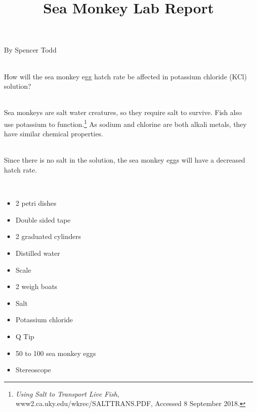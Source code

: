 \documentclass[12pt]{article}
\begin{document}
\title{Sea Monkey Lab Report}{By Spencer Todd}\double

\\
How will the sea monkey egg hatch rate be affected in potassium chloride (KCl) solution?\double

\\
Sea monkeys are salt water creatures, so they require salt to survive. Fish also use potassium to function.\footnote{\textit{Using Salt to Transport Live Fish}, www2.ca.uky.edu/wkrec/SALTTRANS.PDF, Accessed 8 September 2018.} As sodium and chlorine are both alkali metals, they have similar chemical properties.\double

\\
Since there is no salt in the solution, the sea monkey eggs will have a decreased hatch rate.\double

\\
\begin{itemize}
    \item 2 petri dishes
    \item Double sided tape
    \item 2 graduated cylinders
    \item Distilled water
    \item Scale
    \item 2 weigh boats
    \item Salt
    \item Potassium chloride
    \item Q Tip
    \item 50 to 100 sea monkey eggs
    \item Stereoscope
\end{itemize}
\end{document}
